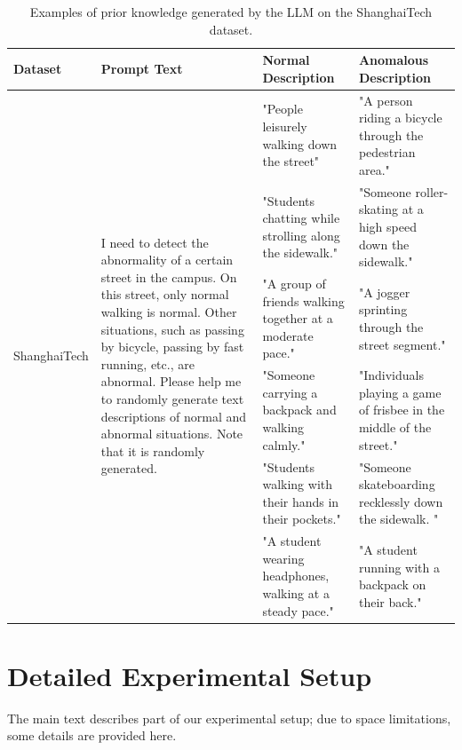 \begin{table}[htb]
\centering
\begin{tabularx}{\textwidth}{lXXX}
\hline
Dataset & Prompt Text & Normal Description                                    & Anomalous Description                                              \\ \hline
\multirow{6}{*}{ShanghaiTech} &
  \multirow{6}{4.5cm}{I need to detect the abnormality of a certain street in the campus. On this street, only normal walking is normal. Other situations, such as passing by bicycle, passing by fast running, etc., are abnormal. Please help me to randomly generate text descriptions of normal and abnormal situations. Note that it is randomly generated.} &
  "People leisurely walking down the street" &
  "A person riding a bicycle through the pedestrian area." \\
        &             & "Students chatting while strolling along the sidewalk."   & "Someone roller-skating at a high speed down the sidewalk."          \\
        &             & "A group of friends walking together at a moderate pace." & "A jogger sprinting through the street segment."                     \\
        &             & "Someone carrying a backpack and walking calmly."         & "Individuals playing a game of frisbee in the middle of the street." \\
        &             & "Students walking with their hands in their pockets."     & "Someone skateboarding recklessly down the sidewalk. "               \\
        &             & "A student wearing headphones, walking at a steady pace." & "A student running with a backpack on their back."                   \\ \hline
\end{tabularx}
\caption{Examples of prior knowledge generated by the LLM on the ShanghaiTech dataset.}
\label{tab:sht-know}
\end{table}





\section{Detailed Experimental Setup}

The main text describes part of our experimental setup; due to space limitations, some details are provided here.

